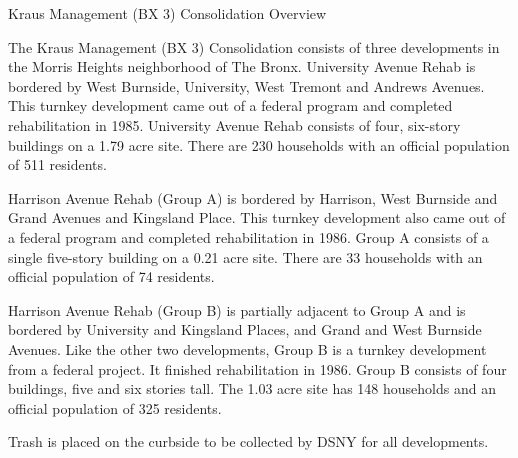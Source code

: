 Kraus Management (BX 3) Consolidation Overview

The Kraus Management (BX 3) Consolidation consists of three developments in the Morris Heights neighborhood of The Bronx. University Avenue Rehab is bordered by West Burnside, University, West Tremont and Andrews Avenues. This turnkey development came out of a federal program and completed rehabilitation in 1985. University Avenue Rehab consists of four, six-story buildings on a 1.79 acre site. There are 230 households with an official population of 511 residents. 

Harrison Avenue Rehab (Group A) is bordered by Harrison, West Burnside and Grand Avenues and Kingsland Place. This turnkey development also came out of a federal program and completed rehabilitation in 1986. Group A consists of a single five-story building on a 0.21 acre site. There are 33 households with an official population of 74 residents.

Harrison Avenue Rehab (Group B) is partially adjacent to Group A and is bordered by University and Kingsland Places, and Grand and West Burnside Avenues. Like the other two developments, Group B is a turnkey development from a federal project. It finished rehabilitation in 1986. Group B consists of four buildings, five and six stories tall. The 1.03  acre site has 148 households and an official population of 325 residents.

Trash is placed on the curbside to be collected by DSNY for all developments.